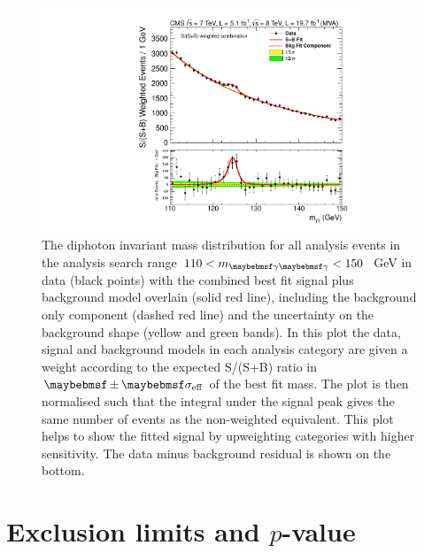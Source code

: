 \begin{figure}
  \includegraphics[width=0.85\textwidth]{results/plots/mgg_mva_110_150_combcat78TeV_weighted.pdf}
  \caption[The S/(S+B) weighted diphoton invariant mass distribution for all analysis events in data with the combined best fit signal plus background model overlain.]{The diphoton invariant mass distribution for all analysis events in the analysis search range $110<\mgg<150$~GeV in data (black points) with the combined best fit signal plus background model overlain (solid red line), including the background only component (dashed red line) and the uncertainty on the background shape (yellow and green bands). In this plot the data, signal and background models in each analysis category are given a weight according to the expected S/(S+B) ratio in $\pm\sigeff$ of the best fit mass. The plot is then normalised such that the integral under the signal peak gives the same number of events as the non-weighted equivalent. This plot helps to show the fitted signal by upweighting categories with higher sensitivity. The data minus background residual is shown on the bottom.}
  \label{fig:sbfit_w}
\end{figure}

\section{Exclusion limits and $p$-value}

